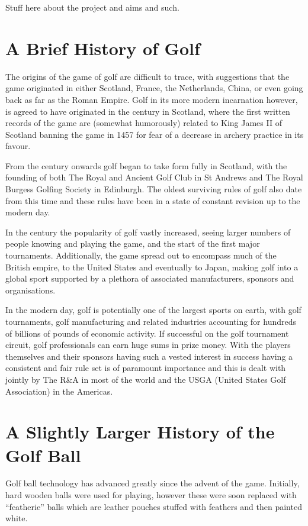 Stuff here about the project and aims and such.

\section{A Brief History of Golf}

The origins of the game of golf are difficult to trace, with suggestions that the game originated
in either Scotland, France, the Netherlands, China, or even going back as far as the Roman Empire.
Golf in its more modern incarnation however, is agreed to have originated in the  century in
Scotland, where the first written records of the game are (somewhat humorously) related to
King James II of Scotland banning the game in 1457 for fear of a decrease in archery practice
in its favour.

From the  century onwards golf began to take form fully in Scotland, with the founding
of both The Royal and Ancient Golf Club in St Andrews and The Royal Burgess Golfing Society
in Edinburgh. The oldest surviving rules of golf also date from this time and these rules have been
in a state of constant revision up to the modern day.

In the  century the popularity of golf vastly increased, seeing larger numbers of people
knowing and playing the game, and the start of the first major tournaments. Additionally, the
game spread out to encompass much of the British empire, to the United States and eventually to
Japan, making golf into a global sport supported by a plethora of associated manufacturers, sponsors
and organisations.

In the modern day, golf is potentially one of the largest sports on earth, with golf tournaments,
golf manufacturing and related industries accounting for hundreds of billions of pounds of
economic activity. If successful on the golf tournament circuit, golf professionals can earn huge sums
in prize money. With the players themselves and their sponsors having such a vested interest in success
having a consistent and fair rule set is of paramount importance and this is dealt with jointly by 
The R\&A in most of the world and the USGA (United States Golf Association) 
in the Americas.

\section{A Slightly Larger History of the Golf Ball}

Golf ball technology has advanced greatly since the advent of the game. Initially, hard wooden
balls were used for playing, however these were soon replaced with “featherie” balls which are
leather pouches stuffed with feathers and then painted white.


